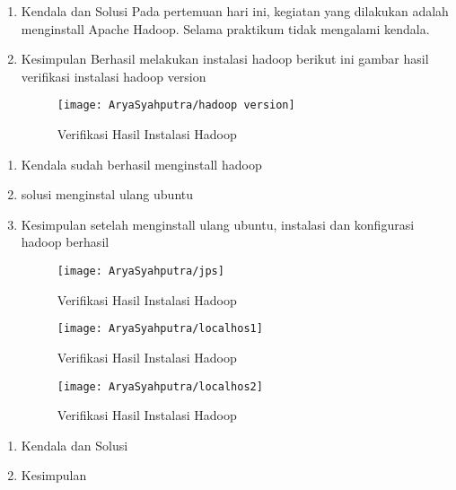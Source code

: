 
\begin{enumerate}
\item Kendala dan Solusi
Pada pertemuan hari ini, kegiatan yang dilakukan adalah menginstall Apache Hadoop. Selama praktikum tidak mengalami kendala.


\item Kesimpulan
Berhasil melakukan instalasi hadoop berikut ini gambar hasil verifikasi instalasi hadoop version 

\begin{figure}[!ht]
\texttt{[image: AryaSyahputra/hadoop version]}
\caption{Verifikasi Hasil Instalasi Hadoop}
\label{gam:Hadoop-version}
\end{figure}
\end{enumerate}

\begin{enumerate}
\item Kendala
sudah berhasil menginstall hadoop

\item solusi
menginstal ulang ubuntu

\item Kesimpulan
setelah menginstall ulang ubuntu, instalasi dan konfigurasi hadoop berhasil

\begin{figure}[!ht]
\texttt{[image: AryaSyahputra/jps]}
\caption{Verifikasi Hasil Instalasi Hadoop}
\label{gam:instalasi-hadoop}
\end{figure}
\begin{figure}[!ht]
\texttt{[image: AryaSyahputra/localhos1]}
\caption{Verifikasi Hasil Instalasi Hadoop}
\label{gam:instalasi-hadoop}
\end{figure}
\begin{figure}[!ht]
\texttt{[image: AryaSyahputra/localhos2]}
\caption{Verifikasi Hasil Instalasi Hadoop}
\label{gam:instalasi-hadoop}
\end{figure}
\end{enumerate}

\clearpage
{}
\begin{enumerate}
\item Kendala dan Solusi



\item Kesimpulan



\end{enumerate}

